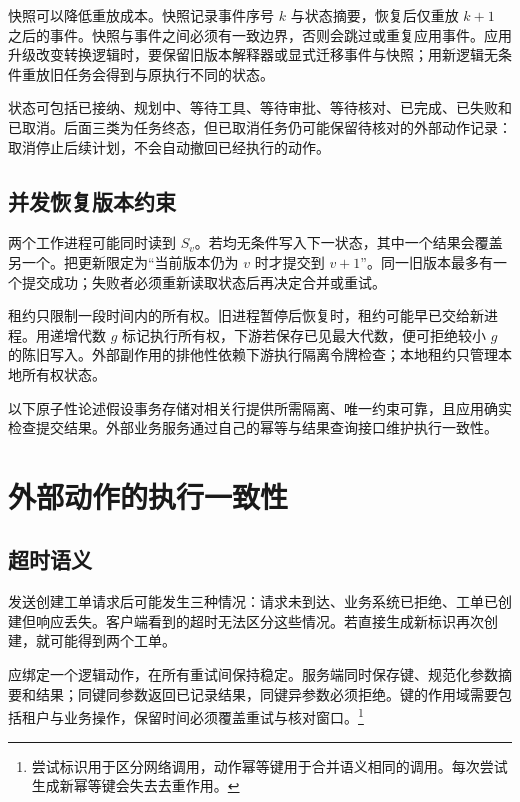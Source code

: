 \documentclass[../textbook.tex]{subfiles}
\begin{document}
快照可以降低重放成本。快照记录事件序号 $k$ 与状态摘要，恢复后仅重放 $k+1$ 之后的事件。快照与事件之间必须有一致边界，否则会跳过或重复应用事件。应用升级改变转换逻辑时，要保留旧版本解释器或显式迁移事件与快照；用新逻辑无条件重放旧任务会得到与原执行不同的状态。

状态可包括已接纳、规划中、等待工具、等待审批、等待核对、已完成、已失败和已取消。后面三类为任务终态，但已取消任务仍可能保留待核对的外部动作记录：取消停止后续计划，不会自动撤回已经执行的动作。

\subsection{并发恢复版本约束}
两个工作进程可能同时读到 $S_v$。若均无条件写入下一状态，其中一个结果会覆盖另一个。把更新限定为“当前版本仍为 $v$ 时才提交到 $v+1$”。同一旧版本最多有一个提交成功；失败者必须重新读取状态后再决定合并或重试。

租约只限制一段时间内的所有权。旧进程暂停后恢复时，租约可能早已交给新进程。用递增代数 $g$ 标记执行所有权，下游若保存已见最大代数，便可拒绝较小 $g$ 的陈旧写入。外部副作用的排他性依赖下游执行隔离令牌检查；本地租约只管理本地所有权状态。

\begin{assumption}
以下原子性论述假设事务存储对相关行提供所需隔离、唯一约束可靠，且应用确实检查提交结果。外部业务服务通过自己的幂等与结果查询接口维护执行一致性。
\end{assumption}

\section{外部动作的执行一致性}

\subsection{超时语义}
发送创建工单请求后可能发生三种情况：请求未到达、业务系统已拒绝、工单已创建但响应丢失。客户端看到的超时无法区分这些情况。若直接生成新标识再次创建，就可能得到两个工单。

应绑定一个逻辑动作，在所有重试间保持稳定。服务端同时保存键、规范化参数摘要和结果；同键同参数返回已记录结果，同键异参数必须拒绝。键的作用域需要包括租户与业务操作，保留时间必须覆盖重试与核对窗口。\footnote{尝试标识用于区分网络调用，动作幂等键用于合并语义相同的调用。每次尝试生成新幂等键会失去去重作用。}
\end{document}
